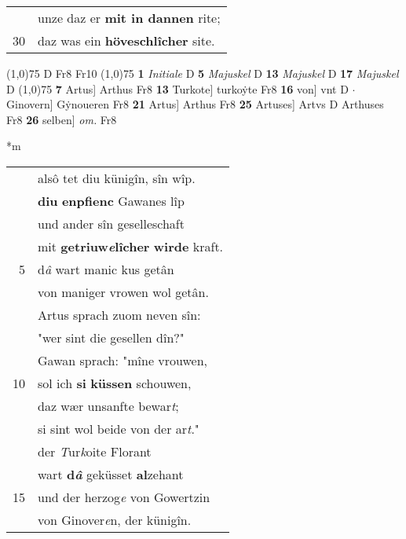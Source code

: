 \documentclass[8pt,a4paper,notitlepage]{article}
\begin{document}
\begin{table}[ht]
\begin{minipage}[t]{0.5\linewidth}
\begin{tabular}{rl}
 & unze daz er \textbf{mit in dannen} rite;\\ 
30 & daz was ein \textbf{höveschlîcher} site.\\ 
\end{tabular}
\scriptsize
\line(1,0){75} \newline
D Fr8 Fr10 \newline
\line(1,0){75} \newline
\textbf{1} \textit{Initiale} D  \textbf{5} \textit{Majuskel} D  \textbf{13} \textit{Majuskel} D  \textbf{17} \textit{Majuskel} D  \newline
\line(1,0){75} \newline
\textbf{7} Artus] Arthus Fr8 \textbf{13} Turkote] turkoẏte Fr8 \textbf{16} von] vnt D  $\cdot$ Ginovern] Gẏnoueren Fr8 \textbf{21} Artus] Arthus Fr8 \textbf{25} Artuses] Artvs D Arthuses Fr8 \textbf{26} selben] \textit{om.} Fr8 \newline
\end{minipage}
\hspace{0.5cm}
\begin{minipage}[t]{0.5\linewidth}
\small
\begin{center}*m
\end{center}
\begin{tabular}{rl}
 & alsô tet diu künigîn, sîn wîp.\\ 
 & \textbf{diu} \textbf{enpfienc} Gawanes lîp\\ 
 & und ander sîn geselleschaft\\ 
 & mit \textbf{getriuw\textit{e}lîcher} \textbf{wirde} kraft.\\ 
5 & d\textit{â} wart manic kus getân\\ 
 & von maniger vrowen wol getân.\\ 
 & Artus sprach zuom neven sîn:\\ 
 & "wer sint die gesellen dîn?"\\ 
 & Gawan sprach: "mîne vrouwen,\\ 
10 & sol ich \textbf{si} \textbf{küssen} schouwen,\\ 
 & daz wær unsanfte bewar\textit{t};\\ 
 & si sint wol beide von der ar\textit{t}."\\ 
 & der \textit{T}ur\textit{k}oite Florant\\ 
 & wart \textbf{d\textit{â}} geküsset \textbf{al}zehant\\ 
15 & und der herzog\textit{e} von Gowertzin\\ 
 & von Ginover\textit{e}n, der künigîn.\\ 

\end{tabular}
\end{minipage}
\end{table}
\end{document}
